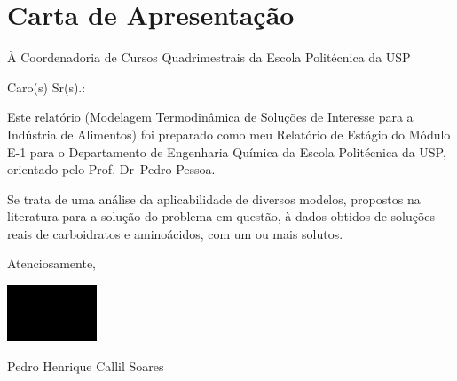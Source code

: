 \chapter*{Carta de Apresentação}

À Coordenadoria de Cursos Quadrimestrais da Escola Politécnica da USP

Caro(s) Sr(s).:

\par Este relatório (Modelagem Termodinâmica de Soluções de Interesse para a
Indústria de Alimentos) foi preparado como meu Relatório de Estágio do Módulo
E-1 para o Departamento de Engenharia Química da Escola Politécnica da USP,
orientado pelo Prof\textordmasculine. Dr\textordmasculine\ Pedro Pessoa.

Se trata de uma análise da aplicabilidade de diversos modelos, propostos na
literatura para a solução do problema em questão, à dados obtidos de soluções
reais de carboidratos e aminoácidos, com um ou mais solutos.

Atenciosamente,

\includegraphics[width=0.2\textwidth]{signature.png}

Pedro Henrique Callil Soares

\newpage
